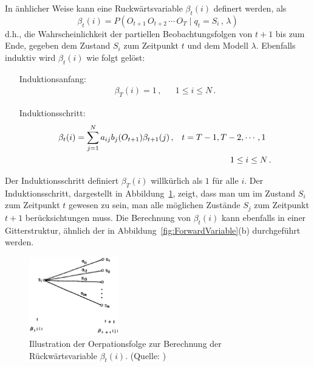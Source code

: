 \newline
In \"anhlicher Weise kann eine R\:uckw\"artsvariable $\beta_t(i)$ definert werden, als
\begin{equation}
\beta_t(i) = P ( O_{t+1} \, O_{t+2} \, \cdots \, O_T \mid q_t = S_i \, , \, \lambda)
\end{equation}
d.h., die Wahrscheinlichkeit der partiellen Beobachtungsfolgen von $t + 1$ bis zum Ende, gegeben dem Zustand $S_i$ zum Zeitpunkt $t$ und dem Modell $\lambda$.
\newline
Ebenfalls induktiv wird $\beta_t(i)$ wie folgt gel\"ost:
\begin{itemize}
\item[Induktionsanfang:]
\begin{align}
 \beta_T(i) = 1 \, , & & 1 \leq i \leq N \, .
\end{align}
\item[Induktionsschritt:]
\begin{align}
\beta_t(i) = \sum_{j = 1}^{N} a_{ij} b_{j} (O_{t + 1}) \beta_{t + 1} (j) \, , & & t = T - 1, T - 2, \cdots , 1 \, \, \, \,  \notag \\
& & 1 \leq i \leq N \, .
\end{align}
\end{itemize}
Der Induktionsschritt definiert $ \beta_T(i)$ willk\"urlich als $1$ f\"ur alle $i$. Der Induktionsschritt, dargestellt in Abbildung~\ref{fig:BackwardVariable}, zeigt, dass man um im Zustand $S_i$ zum Zeitpunkt $t$ gewesen zu sein, man alle m\"oglichen Zust\"ande $S_j$ zum Zeitpunkt $t + 1$ ber\"ucksichtungen muss.
\newline
Die Berechnung von $\beta_t(i)$ kann ebenfalls in einer Gitterstruktur, \"ahnlich der in Abbildung~\ref{fig:ForwardVariable}(b) durchgef\"uhrt werden.
\begin{figure}[htb]
\centering
\includegraphics[width=0.35\textwidth]{img/markov/backward_variable.png}
\caption[Illustration der Oerpationsfolge zur Berechnung der R\"uckw\"artsvariable.]{Illustration der Oerpationsfolge zur Berechnung der R\"uckw\"artsvariable $\beta_{t}(i)$. (Quelle: )}
\label{fig:BackwardVariable}
\end{figure}

